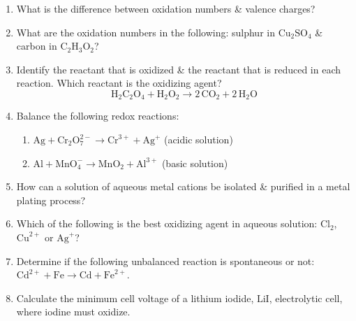 \documentclass[12pt]{article}
\begin{document}
\begin{enumerate}[label=\arabic*.]
    \item What is the difference between oxidation numbers \& valence charges?
    \vspace{2.5cm}

    \item What are the oxidation numbers in the following: sulphur in $\text{Cu}_2\text{SO}_4$ \& carbon in $\text{C}_2\text{H}_3\text{O}_2$?
    \vspace{2.5cm}

    \item Identify the reactant that is oxidized \& the reactant that is reduced in each reaction. Which reactant is the oxidizing agent?
    \[
    \text{H}_2\text{C}_2\text{O}_4 + \text{H}_2\text{O}_2 \rightarrow 2\,\text{CO}_2 + 2\,\text{H}_2\text{O}
    \]
    \vspace{3cm}

    \item Balance the following redox reactions:
    \begin{enumerate}[label=\alph*)]
        \item $\text{Ag} + \text{Cr}_2\text{O}_7^{2-} \rightarrow \text{Cr}^{3+} + \text{Ag}^+$ \quad (acidic solution)
        \vspace{3cm}
        \item $\text{Al} + \text{MnO}_4^- \rightarrow \text{MnO}_2 + \text{Al}^{3+}$ \quad (basic solution)
        \vspace{3cm}
    \end{enumerate}

    \item How can a solution of aqueous metal cations be isolated \& purified in a metal plating process?
    \vspace{3.5cm}

    \item Which of the following is the best oxidizing agent in aqueous solution: $\text{Cl}_2$, $\text{Cu}^{2+}$ or $\text{Ag}^+$?
    \vspace{2.5cm}

    \item Determine if the following unbalanced reaction is spontaneous or not: $\text{Cd}^{2+} + \text{Fe} \rightarrow \text{Cd} + \text{Fe}^{2+}$.
    \vspace{2.5cm}

    \item Calculate the minimum cell voltage of a lithium iodide, $\text{LiI}$, electrolytic cell, where iodine must oxidize.
    \vspace{3.5cm}


\end{enumerate}
\end{document}
